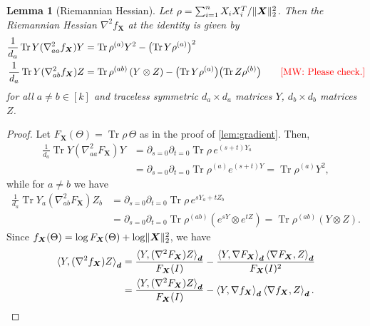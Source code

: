 \documentclass{article}
\newtheorem{lemma}[theorem]{Lemma}
\DeclarePairedDelimiter{\norm}{\lVert}{\rVert}
\newcommand{\ot}{\otimes}
\renewcommand{\vec}{\bm}
\newcommand\tr{\operatorname{Tr}}
\newcommand{\MW}[1]{{\color{red}[MW: #1]}}
\begin{document}
\begin{lemma}[Riemannian Hessian]\label{lem:hessian}
Let $\rho = \sum_{i=1}^n X_i X_i^T / \norm{\vec X}_2^2$.
Then the Riemannian Hessian $\nabla^2 f_{\vec X}$ at the identity is given by
\begin{align*}
  \frac1{d_a} \tr Y (\nabla^2_{aa} f_{\vec X}) Y
&= \tr \rho^{(a)} Y^2 - \bigl(\tr Y \rho^{(a)}\bigr)^2 \\
  \frac1{d_a} \tr Y (\nabla^2_{ab} f_{\vec X}) Z
&= \tr \rho^{(ab)} \left( Y \ot Z \right) - \bigl(\tr Y \rho^{(a)}\bigr)\bigl(\tr Z \rho^{(b)}\bigr) \qquad\text{\MW{Please check.}}
\end{align*}
for all $a\neq b\in[k]$ and traceless symmetric $d_a\times d_a$ matrices $Y$, $d_b\times d_b$ matrices~$Z$.
\end{lemma}
\begin{proof}
  Let $F_{\vec X}(\Theta) = \tr \rho \, \Theta$ as in the proof of \cref{lem:gradient}.
  Then,
  \begin{align*}
    \frac 1{d_a} \tr Y \left( \nabla^2_{aa} F_{\vec X} \right) Y
  &= \partial_{s=0} \partial_{t=0} \tr \rho \, e^{(s+t) Y_a} \\
  &= \partial_{s=0} \partial_{t=0} \tr \rho^{(a)} e^{(s+t) Y}
  = \tr \rho^{(a)} Y^2,
  \end{align*}
  while for $a\neq b$ we have
  \begin{align*}
    \frac 1{d_a} \tr Y_a \left( \nabla^2_{ab} F_{\vec X} \right) Z_b
  &= \partial_{s=0} \partial_{t=0} \tr \rho \, e^{s Y_a + t Z_b} \\
  &= \partial_{s=0} \partial_{t=0} \tr \rho^{(ab)} \left( e^{s Y} \ot e^{t Z} \right)
  = \tr \rho^{(ab)} \left( Y \ot Z \right).
  \end{align*}
  Since $f_{\vec X}(\Theta) = \log F_{\vec X}(\Theta) + \log \norm{\vec X}_2^2$, we have
  \begin{align*}
    \braket{Y, (\nabla^2 f_{\vec X}) Z}_{\vec d}
  &= \frac{\braket{Y, (\nabla^2 F_{\vec X}) Z}_{\vec d}}{F_{\vec X}(I)} - \frac{\braket{Y, \nabla F_{\vec X}}_{\vec d} \braket{\nabla F_{\vec X}, Z}_{\vec d}}{F_{\vec X}(I)^2} \\
  &= \frac{\braket{Y, (\nabla^2 F_{\vec X}) Z}_{\vec d}}{F_{\vec X}(I)} - \braket{Y, \nabla f_{\vec X}}_{\vec d} \braket{\nabla f_{\vec X}, Z}_{\vec d}.
  \end{align*}

\end{proof}
\end{document}
